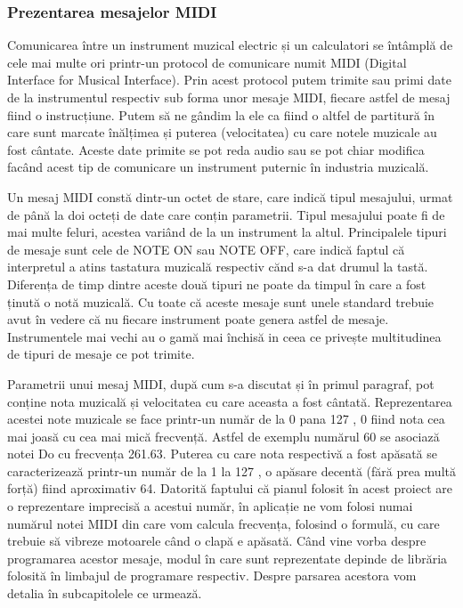 \documentclass[../IoMusT.tex]{subfiles}
\begin{document}
\subsubsection{Prezentarea mesajelor MIDI}
Comunicarea între un instrument muzical electric și un calculatori se întâmplă de cele mai multe ori printr-un protocol de comunicare numit MIDI (Digital Interface for Musical Interface). Prin acest protocol putem trimite sau primi date de la instrumentul respectiv sub forma unor mesaje MIDI, fiecare astfel de mesaj fiind o instrucțiune. Putem să ne gândim la ele ca fiind o altfel de partitură în care sunt marcate înălțimea și puterea (velocitatea) cu care notele muzicale au fost cântate. Aceste date primite se pot reda audio sau se pot chiar modifica facând acest tip de comunicare un instrument puternic în industria muzicală. 
\\
\par Un mesaj MIDI constă dintr-un octet de stare, care indică tipul mesajului, urmat de până la doi octeți de date care conțin parametrii. Tipul mesajului poate fi de mai multe feluri, acestea variând de la un instrument la altul. Principalele tipuri de mesaje sunt cele de NOTE ON sau NOTE OFF, care indică faptul că interpretul a atins tastatura muzicală respectiv cănd s-a dat drumul la tastă. Diferența de timp dintre aceste două tipuri ne poate da timpul în care a fost ținută o notă muzicală. Cu toate că aceste mesaje sunt unele standard trebuie avut în vedere că nu fiecare instrument poate genera astfel de mesaje. Instrumentele mai vechi au o gamă mai închisă in ceea ce privește multitudinea de tipuri de mesaje ce pot trimite.
\\ 
\par Parametrii unui mesaj MIDI, după cum s-a discutat și în primul paragraf, pot conține nota muzicală și velocitatea cu care aceasta a fost cântată. Reprezentarea acestei note muzicale se face printr-un număr de la 0 pana 127 \cite{MidiSoftware}, 0 fiind nota cea mai joasă cu cea mai mică frecvență. Astfel de exemplu numărul 60 se asociază notei Do cu frecvența 261.63. Puterea cu care nota respectivă a fost apăsată se caracterizează printr-un număr de la 1 la 127 \cite{MidiSoftware}, o apăsare decentă (fără prea multă forță) fiind aproximativ 64. Datorită faptului că pianul folosit în acest proiect are o reprezentare imprecisă a acestui număr, în aplicație ne vom folosi numai numărul notei MIDI din care vom calcula frecvența, folosind o formulă, cu care trebuie să vibreze motoarele când o clapă e apăsată. Când vine vorba despre programarea acestor mesaje, modul în care sunt reprezentate depinde de librăria folosită în limbajul de programare respectiv. Despre parsarea acestora vom detalia în subcapitolele ce urmează.
\end{document}
